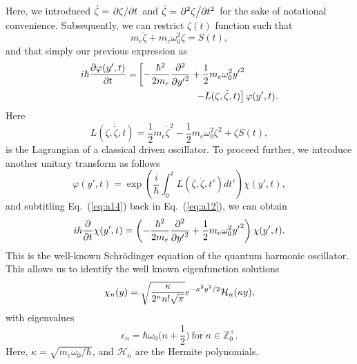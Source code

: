 \documentclass[
 reprint,
 amsmath,amssymb,
 aps,
 prb,
]{revtex4-2}
\begin{document}
Here, we introduced $\dot{\zeta} = \pdv*{\zeta}{t}$ and $\ddot{\zeta} = \pdv*[2]{\zeta}{t}$ for the sake of notational convenience. Subsequently, we can restrict $\zeta(t)$ function such that
\begin{equation} \label{eq:a11}
  m_e\ddot{\zeta} + m_e\omega_0^2\zeta = S(t),
\end{equation}
and that simply our previous expression as
\begin{equation} \label{eq:a12}
  \begin{aligned}
    i \hbar \pdv{\varphi(y',t)}{t} =&
    \left[
        -  \frac{\hbar^2}{2m_e}\pdv[2]{{y'}}
        + \frac{1}{2} m_e \omega_0^2 {y'}^2 \right. \\
        & \left. \qquad\qquad\qquad
        - L(\zeta,\dot{\zeta},t)
    \right]\varphi(y',t).
  \end{aligned}
\end{equation}
Here
\begin{equation} \label{eq:a13}
  L(\zeta,\dot{\zeta},t) = \frac{1}{2} m_e\dot{\zeta}^2 - \frac{1}{2}m_e\omega_0^2 \zeta^2 + \zeta S(t),
\end{equation}
is the Lagrangian of a classical driven oscillator. To proceed further, we introduce another unitary transform as follows
\begin{equation} \label{eq:a14}
    \varphi(y',t) = \exp(\frac{i}{\hbar}\int_0^{t} L(\zeta,\dot{\zeta},t')dt') \chi(y',t),
\end{equation}
and subtitling Eq.~(\ref{eq:a14}) back in Eq.~(\ref{eq:a12}), we can obtain
\begin{equation} \label{eq:a15}
    i \hbar \pdv{t} \chi(y',t)  =
    \left(
        -  \frac{\hbar^2}{2m_e}\pdv[2]{{y'}}
        + \frac{1}{2} m_e \omega_0^2 {y'}^2
    \right) \chi(y',t).
\end{equation}
This is the well-known Schrödinger equation of the quantum harmonic oscillator.
This allows us to identify the well known eigenfunction solutions \cite{griffiths18,shankar94}
\begin{equation} \label{eq:a16}
  \chi_n(y) =
  \sqrt{\frac{\kappa}{2^{n}n!\sqrt{\pi}}}
  e^{-\kappa^2 y^2/2}
  \mathcal{H}_n \qty(\kappa y),
\end{equation}
with eigenvalues
\begin{equation} \label{eq:a17}
  \epsilon_n = \hbar \omega_0 \bigg(n + \frac{1}{2}\bigg)
  ~\text{for}~
  n \in \mathbb{Z}^{+}_0.
\end{equation}
Here, $\kappa = \sqrt{{m_e \omega_0}/{\hbar}}$, and $\mathcal{H}_n$ are the Hermite polynomials.
\end{document}
